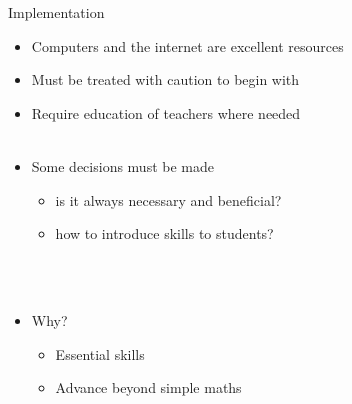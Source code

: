 \documentclass{beamer}
\begin{document}
\begin{frame}{Implementation}
    \begin{itemize}
        \item Computers and the internet are excellent resources
        \item Must be treated with caution to begin with
        \item Require education of teachers where needed \\~\\
        \pause
        \item Some decisions must be made
        \begin{itemize}
                \item is it always necessary and beneficial?
                \item how to introduce skills to students?
        \end{itemize}
        \\~\\
        \pause
        \item Why?
        \begin{itemize}
            \item Essential skills
            \item Advance beyond simple maths
        \end{itemize}
    \end{itemize}
\end{frame}
\end{document}

